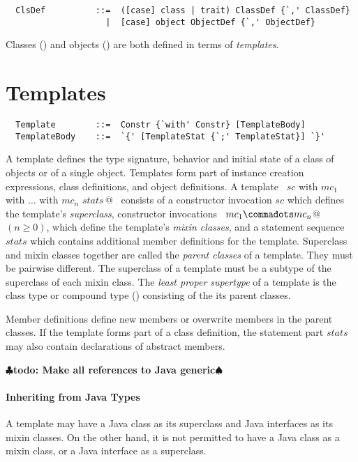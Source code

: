\documentclass[a4paper,12pt,twoside,titlepage]{book}
\renewcommand{\todo}[1]{{$\clubsuit$\bf todo: #1$\spadesuit$}}
\begin{document}
\syntax\begin{lstlisting}
  ClsDef          ::=  ([case] class | trait) ClassDef {`,' ClassDef}
                    |  [case] object ObjectDef {`,' ObjectDef}
\end{lstlisting}

Classes () and objects
() are both defined in terms of {\em templates}.

\section{Templates}
\label{sec:templates}

\syntax\begin{lstlisting}
  Template        ::=  Constr {`with' Constr} [TemplateBody]
  TemplateBody    ::=  `{' [TemplateStat {`;' TemplateStat}] `}'
\end{lstlisting}

A template defines the type signature, behavior and initial state of a
class of objects or of a single object. Templates form part of
instance creation expressions, class definitions, and object
definitions.  A template
~\lstinline@$sc$ with $mc_1$ with $\ldots$ with $mc_n$ {$stats\,$}@~
consists of a constructor invocation $sc$
which defines the template's {\em superclass}, constructor invocations
~\lstinline@$mc_1 \commadots mc_n$@~ $(n \geq 0)$, which define the
template's {\em mixin classes}, and a statement sequence $stats$ which
contains additional member definitions for the template.  Superclass
and mixin classes together are called the {\em parent classes} of a
template.  They must be pairwise different.  The superclass of a
template must be a subtype of the superclass of each mixin class.  The
{\em least proper supertype} of a template is the class type or
compound type () consisting of the its parent
classes.

Member definitions define new members or overwrite members in the
parent classes.  If the template forms part of a class definition,
the statement part $stats$ may also contain declarations of abstract members.

\todo{Make all references to Java generic}

\paragraph{Inheriting from Java Types} A template may have a Java class as
its superclass and Java interfaces as its mixin classes. On the other
hand, it is not permitted to have a Java class as a mixin class, or a
Java interface as a superclass.
\end{document}
